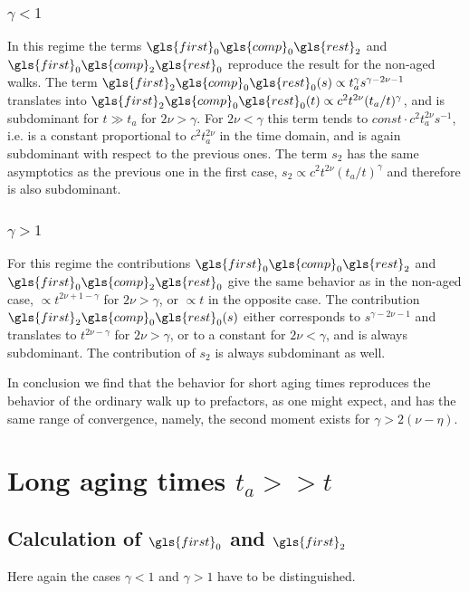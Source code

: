 \subsubsection{$\gamma<1$}
In this regime the terms $\gls{first}_0\gls{comp}_0 \gls{rest}_2 $ and $ \gls{first}_0\gls{comp}_2 \gls{rest}_0$ reproduce the result for the non-aged walks. The term $\gls{first}_2\gls{comp}_0 \gls{rest}_0 (s)  \propto t_a^\gamma s^{\gamma-2\nu -1}$
translates into $\gls{first}_2\gls{comp}_0 \gls{rest}_0 (t) \propto c^2 t^{2\nu}(t_a/t)^\gamma$, and is subdominant for $t \gg t_a$ for $2\nu > \gamma$. For $2\nu < \gamma$ this term tends to
$const \cdot  c^2 t_a^{2\nu}s^{-1}$, i.e. is a constant proportional to $c^2 t_a^{2\nu}$ in the time domain, and is again subdominant with respect to the previous ones.
The term $s_2$ has the same asymptotics as the previous one in the first case, $s_2 \propto c^2 t^{2\nu}(t_a/t)^\gamma$ and therefore is also subdominant. 

\subsubsection{$\gamma>1$}
For this regime the contributions $\gls{first}_0\gls{comp}_0 \gls{rest}_2 $ and $\gls{first}_0\gls{comp}_2 \gls{rest}_0 $ give the same behavior as in the non-aged case, $\propto t^{2\nu +1- \gamma }$ for $2\nu > \gamma$,
or  $\propto t$ in the opposite case. The contribution $\gls{first}_2\gls{comp}_0 \gls{rest}_0 (s)$ either corresponds to 
$s^{\gamma-2\nu -1}$ and translates to $t^{2\nu - \gamma}$ for $2\nu > \gamma$, or to a constant for $2\nu < \gamma$, and is always subdominant. The contribution of $s_2$ is always 
subdominant as well. 

In conclusion we find that the behavior for short aging times reproduces the behavior of the ordinary walk up to prefactors, as one might expect, and has the same range of convergence, namely, the second
moment exists for $\gamma > 2(\nu-\eta)$.


\section{Long aging times $t_a >> t$ \label{sec:considerably}}

\subsection{Calculation of $\gls{first}_0$ and $\gls{first}_2$}

Here again the cases $\gamma<1$ and $\gamma >1$ have to be distinguished. 

